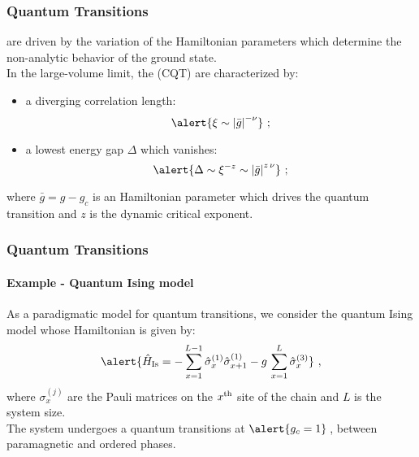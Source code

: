 \begin{frame}
\frametitle{Quantum Transitions}
\textbf{} are driven by the variation of the Hamiltonian parameters which determine the non-analytic behavior of the ground state.\\
$ $\\
In the large-volume limit, the  (CQT) are characterized by:
\begin{itemize}
\item a diverging correlation length: 
\begin{equation}
\alert{\xi \sim \abs*{\bar g}^{-\nu}} \,\,;
\end{equation}
\item a lowest energy gap $\Delta$ which vanishes:%
\begin{equation}
\alert{\Delta \sim \xi^{-z} \sim \abs*{\bar g}^{z\,\nu}} \,\,;
\end{equation}
\end{itemize}
where $\bar g = g - g_c$ is an Hamiltonian parameter which drives the quantum transition and $z$ is the dynamic critical exponent.
\end{frame}

\begin{frame}
	\frametitle{Quantum Transitions}
	\framesubtitle{Example - Quantum Ising model}
	
	As a paradigmatic model for quantum transitions, we consider the quantum Ising model whose Hamiltonian is given by:
	\begin{equation}
	\alert{
	  \hat H_{\rm Is} = -\sum_{x=1}^{L-1} \hat \sigma^{(1)}_x \hat
	  \sigma^{(1)}_{x+1} - g\, \sum_{x=1}^L \hat \sigma^{(3)}_x }\,\,,
	  \label{ising}
	\end{equation}
	where $\sigma^{(j)} _x$ are the Pauli matrices on the $x^{\rm th}$ site of the chain and $L$ is the system size.\\
	$ $\\
	
	The system undergoes a \alert{quantum transitions} at $\alert{g_c=1}\,$, between paramagnetic and ordered phases.\\
\end{frame}



